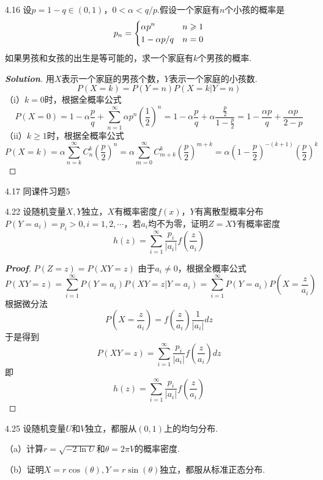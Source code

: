 \documentclass[10pt, a4paper, oneside]{ctexart}
\newenvironment{solution}{\begin{proof}[\bf Solution]}{\end{proof}}
\newenvironment{myproof}{\begin{proof}[\bf Proof]}{\end{proof}}
\begin{document}
4.16 设$p=1-q\in (0,1)$，$0<\alpha<q/p$.假设一个家庭有$n$个小孩的概率是
\[{p_n} = \left\{ \begin{gathered}
  \alpha {p^n} \hfill \quad n\geqslant 1\\
  1 - \alpha p/q \hfill \quad n=0\\ 
\end{gathered}  \right.\]
如果男孩和女孩的出生是等可能的，求一个家庭有$k$个男孩的概率.
\begin{solution}
用$X$表示一个家庭的男孩个数，$Y$表示一个家庭的小孩数.    
\[P(X = k) = P(Y = n)P(X = k|Y = n)\]
    （i）$k=0$时，根据全概率公式
    \[P(X = 0) = 1 - \alpha \frac{p}{q} + {\sum\limits_{n = 1}^\infty  {\alpha {p^n}\left( {\frac{1}{2}} \right)} ^n} = 1 - \alpha \frac{p}{q} + \alpha \frac{{\frac{p}{2}}}{{1 - \frac{p}{2}}} = 1 - \frac{{\alpha p}}{q} + \frac{{\alpha p}}{{2 - p}}\]
    （ii）$k\geqslant 1$时，根据全概率公式
    \[P(X = k) = \alpha {\sum\limits_{n = k}^\infty  {C_n^k\left( {\frac{p}{2}} \right)} ^n} = \alpha {\sum\limits_{m = 0}^\infty  {C_{m + k}^k\left( {\frac{p}{2}} \right)} ^{m + k}} = \alpha {\left( {1 - \frac{p}{2}} \right)^{ - (k + 1)}}{\left( {\frac{p}{2}} \right)^k}\]
\end{solution}

4.17 同课件习题$5$

4.22 设随机变量$X,Y$独立，$X$有概率密度$f(x)$，$Y$有离散型概率分布$P(Y=a_i)=p_i>0,i=1,2,\cdots$，若$a_i$均不为零，证明$Z=XY$有概率密度
\[h(z) = \sum\limits_{i = 1}^\infty  {\frac{{{p_i}}}{{|{a_i}|}}f\left( {\frac{z}{{{a_i}}}} \right)} \]
\begin{myproof}
 $P(Z=z)=P(XY=z)$
 由于$a_i\ne 0$，根据全概率公式
\[P(XY = z) = \sum\limits_{i = 1}^\infty  {P(Y = {a_i})P(XY = z|Y = {a_i})}  = \sum\limits_{i = 1}^\infty  {P(Y = {a_i})P(X = \frac{z}{{{a_i}}})} \]
根据微分法
\[P(X = \frac{z}{{{a_i}}}) = f\left( {\frac{z}{{{a_i}}}} \right)\frac{1}{{|{a_i}|}}dz\]
于是得到
\[P(XY = z) = \sum\limits_{i = 1}^\infty  {\frac{{{p_i}}}{{|{a_i}|}}f\left( {\frac{z}{{{a_i}}}} \right)dz} \]
即
\[h(z) = \sum\limits_{i = 1}^\infty  {\frac{{{p_i}}}{{|{a_i}|}}f\left( {\frac{z}{{{a_i}}}} \right)} \]
\end{myproof}

4.25 设随机变量$U$和$V$独立，都服从$(0,1)$上的均匀分布.

（a）计算$r=\sqrt{-2\ln U}$和$\theta=2\pi V$的概率密度.

（b）证明$X=r\cos(\theta),Y=r\sin(\theta)$独立，都服从标准正态分布.
\end{document}
